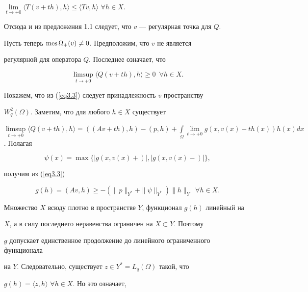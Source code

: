 $\lim\limits_{ t \to +0} \langle T(v+th),h \rangle 


\le \langle T v,h \rangle$ $\forall h \in X$.


Отсюда и из предложения 1.1 следует, что $v$ --- регулярная точка для $Q$.


Пусть теперь $\operatorname{mes}\Omega_{+}(v) \ne 0$. Предположим, что $v$ не является


регулярной для оператора $Q$. Последнее означает, что


\begin{equation}


\limsup\limits_{t \to +0}


\langle Q(v+th),h \rangle \ge 0 \ \; \forall h \in X.


\label{eq3.3}


\end{equation}


Покажем, что из (\ref{eq3.3}) следует принадлежность $v$ пространству


$W^2_q(\Omega)$. Заметим, что для любого $h \in X$ существует 


$\limsup\limits_{t \to +0} \langle Q(v+th),h \rangle=((A v+th),h)-(p,h)


+\int\limits_\Omega \lim\limits_{t\to +0}


g(x,v(x)+th(x))h(x) dx$. Полагая


\begin{equation}


\psi(x)=\max\{|g(x,v(x)+)|,|g(x,v(x)-)|\}, \label{eq3.4}


\end{equation}


получим из (\ref{eq3.3})


$$


g(h)=(A v,h)\ge-(\| p \|_{Y^*}+\| \psi \|_{Y^*})


\| h \|_Y \ \; \forall h \in X.


$$





Множество $X$ всюду плотно в пространстве $Y$, функционал $g(h)$ линейный на


$X$, а в силу последнего неравенства ограничен на $X \subset Y$. Поэтому


$g$ допускает единственное продолжение до линейного ограниченного функционала


на $Y$. Следовательно, существует $z\in Y^*=L_q(\Omega)$ такой, что


$g(h)=\langle z,h \rangle$ $\forall h \in X$. Но это означает,


